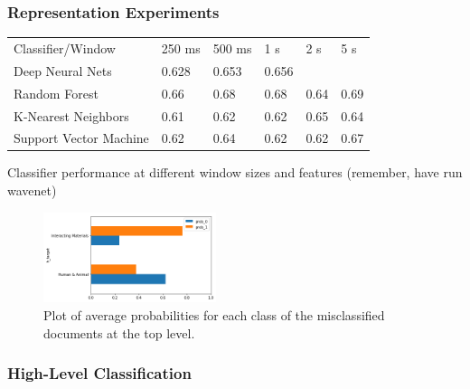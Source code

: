 \subsubsection{Representation Experiments}

\begin{table}[]
    \begin{tabular}{llllll}
    Classifier/Window       & 250 ms & 500 ms & 1 s   & 2 s  & 5 s   \\
    Deep Neural Nets        & 0.628  & 0.653  & 0.656 &      &       \\
    Random Forest           & 0.66   & 0.68   & 0.68  & 0.64 & 0.69  \\
    K-Nearest Neighbors     & 0.61   & 0.62   & 0.62  & 0.65 & 0.64 \\
    Support Vector Machine  & 0.62   & 0.64   & 0.62  & 0.62 & 0.67   
    \end{tabular}
\end{table}

Classifier performance at different window sizes and features (remember, have run wavenet)

\begin{figure}[h]
    \centering
    \includegraphics[width=0.45\textwidth]{figures/knn-prob-plot.png}
    \caption{Plot of average probabilities for each class of the misclassified documents at the top level.}
    \label{fig:a}
\end{figure}

\subsubsection{High-Level Classification}

